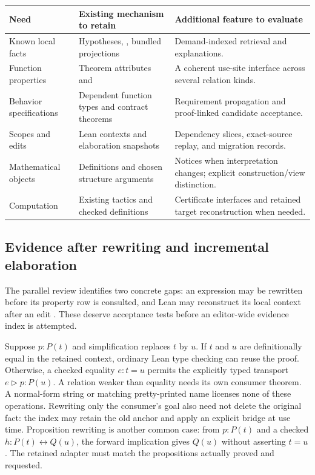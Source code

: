 \documentclass[11pt,letterpaper]{article}
\newcommand{\code}[1]{\texttt{\detokenize{#1}}}
\theoremstyle{definition}\newtheorem{definition}[proposition]{Definition}
\theoremstyle{remark}\newtheorem{remark}[proposition]{Remark}
\begin{document}
\begin{center}\small
\begin{tabularx}{\textwidth}{@{}P{0.20\textwidth}Y Y@{}}
\toprule Need & Existing mechanism to retain & Additional feature to evaluate\\\midrule
Known local facts & Hypotheses, \code{have}, bundled projections & Demand-indexed retrieval and explanations.\\
Function properties & Theorem attributes and \code{fun_prop} & A coherent use-site interface across several relation kinds.\\
Behavior specifications & Dependent function types and contract theorems & Requirement propagation and proof-linked candidate acceptance.\\
Scopes and edits & Lean contexts and elaboration snapshots & Dependency slices, exact-source replay, and migration records.\\
Mathematical objects & Definitions and chosen structure arguments & Notices when interpretation changes; explicit construction/view distinction.\\
Computation & Existing tactics and checked definitions & Certificate interfaces and retained target reconstruction when needed.\\
\bottomrule
\end{tabularx}
\end{center}

\subsection{Evidence after rewriting and incremental elaboration}\label{sec:anchor-lifetime}
The parallel review identifies two concrete gaps: an expression may be
rewritten before its property row is consulted, and Lean may reconstruct its
local context after an edit \cite[Sections 8.3 and 11]{round3-peer}. These
deserve acceptance tests before an editor-wide evidence index is attempted.

Suppose $p:P(t)$ and simplification replaces $t$ by $u$.
If $t$ and $u$ are definitionally equal in the retained context, ordinary Lean
type checking can reuse the proof. Otherwise, a checked equality $e:t=u$
permits the explicitly typed transport $e\mathbin{\triangleright}p:P(u)$.
A relation weaker than equality needs its own consumer theorem. A normal-form
string or matching pretty-printed name licenses none of these operations.
Rewriting only the consumer's goal also need not delete the original fact:
the index may retain the old anchor and apply an explicit bridge at use time.
Proposition rewriting is another common case: from $p:P(t)$ and a checked
$h:P(t)\leftrightarrow Q(u)$, the forward implication gives $Q(u)$ without
asserting $t=u$. The retained adapter must match the propositions actually
proved and requested.
\end{document}
